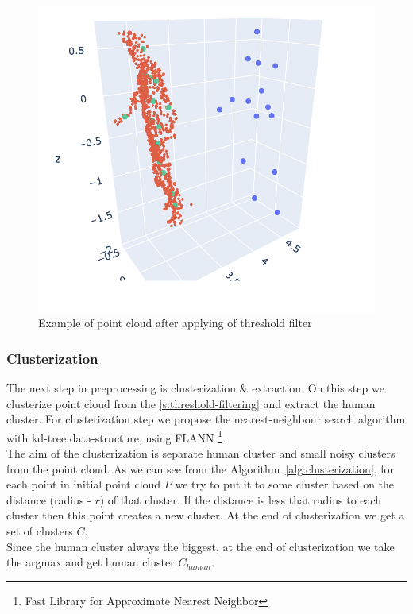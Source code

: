 \begin{figure}[htbp]
    \centerline{\includegraphics[scale=.4]{Figures/template.png}}
    \caption{Example of point cloud after applying of threshold filter}
    \label{img:after-threshold-filtering}
\end{figure}

\subsubsection{Clusterization}
The next step in preprocessing is clusterization \& extraction. On this step we clusterize point cloud from the \ref{s:threshold-filtering} and extract the human cluster. For clusterization step we propose the nearest-neighbour search algorithm \parencite{noauthor_nearest_2021} with kd-tree data-structure, using FLANN \footnote{Fast Library for Approximate Nearest Neighbor}. \\
The aim of the clusterization is separate human cluster and small noisy clusters from the point cloud. As we can see from the Algorithm~\ref{alg:clusterization}, for each point in initial point cloud $P$ we try to put it to some cluster based on the distance (radius - $r$) of that cluster. If the distance is less that radius to each cluster then this point creates a new cluster. At the end of clusterization we get a set of clusters $C$. \\
Since the human cluster always the biggest, at the end of clusterization we take the argmax and get human cluster $C_{human}$.

